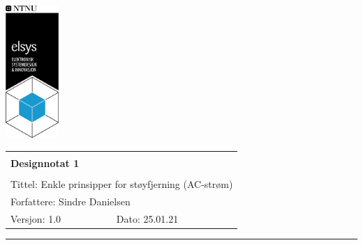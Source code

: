 \documentclass[a4paper,11pt,norsk]{article}
\begin{document}
\begin{minipage}[c]{0.15\textwidth}
\includegraphics[width=2.0cm]{elsys_pos_staaende_ntnu.png}
\end{minipage}
\begin{minipage}[c]{0.85\textwidth}

\renewcommand{\arraystretch}{1.7}
\large 
\begin{tabularx}{\textwidth}{|X|X|}
\hline
\multicolumn{2}{|l|}{} \\
\multicolumn{2}{|l|}{\huge \textbf{Designnotat 1}} \\
\multicolumn{2}{|l|}{}  \\
\hline
\multicolumn{2}{|l|}{Tittel: 
Enkle prinsipper for støyfjerning (AC-strøm)
} \\
\hline
\multicolumn{2}{|l|}{Forfattere: 
Sindre Danielsen
} \\
\hline
Versjon: 1.0 & Dato: 25.01.21
\\
\hline 
\end{tabularx}
\end{minipage}
\normalsize


\setlength{\parskip}{0ex}
\renewcommand{\baselinestretch}{0.1}\normalsize
\tableofcontents
\renewcommand{\baselinestretch}{1.00}\normalsize
\setlength{\parskip}{2ex}
\rule{\textwidth}{1pt}

\newpage
\end{document}
